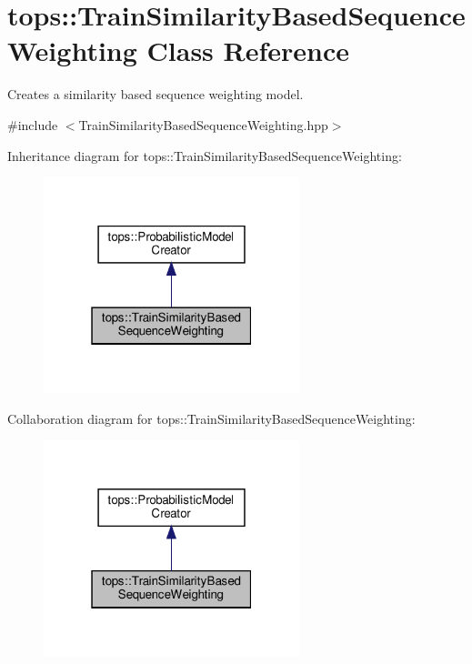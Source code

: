 \hypertarget{classtops_1_1TrainSimilarityBasedSequenceWeighting}{}\section{tops\+:\+:Train\+Similarity\+Based\+Sequence\+Weighting Class Reference}
\label{classtops_1_1TrainSimilarityBasedSequenceWeighting}


Creates a similarity based sequence weighting model.  




{\ttfamily \#include $<$Train\+Similarity\+Based\+Sequence\+Weighting.\+hpp$>$}



Inheritance diagram for tops\+:\+:Train\+Similarity\+Based\+Sequence\+Weighting\+:
\nopagebreak
\begin{figure}[H]
\begin{center}
\leavevmode
\includegraphics[width=211pt]{classtops_1_1TrainSimilarityBasedSequenceWeighting__inherit__graph}
\end{center}
\end{figure}


Collaboration diagram for tops\+:\+:Train\+Similarity\+Based\+Sequence\+Weighting\+:
\nopagebreak
\begin{figure}[H]
\begin{center}
\leavevmode
\includegraphics[width=211pt]{classtops_1_1TrainSimilarityBasedSequenceWeighting__coll__graph}
\end{center}
\end{figure}
